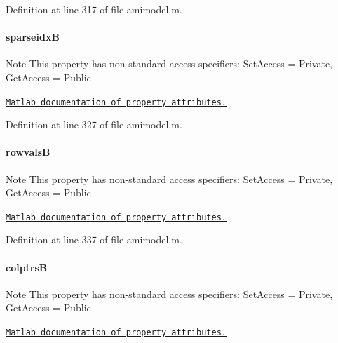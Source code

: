 Definition at line 317 of file amimodel.\+m.

\hypertarget{classamimodel_adcfae93a688a66f1954d0832f51e4cc0}{}
\paragraph[{sparseidx\+B}]{\setlength{\rightskip}{0pt plus 5cm}sparseidx\+B}\label{classamimodel_adcfae93a688a66f1954d0832f51e4cc0}
\begin{DoxyNote}{Note}
This property has non-\/standard access specifiers\+: {\ttfamily Set\+Access = Private, Get\+Access = Public} 

\href{http://www.mathworks.com/help/matlab/matlab_oop/property-attributes.html}{\tt Matlab documentation of property attributes.} 
\end{DoxyNote}


Definition at line 327 of file amimodel.\+m.

\hypertarget{classamimodel_a1ba81ee0e28fe7c7576911973c82be70}{}
\paragraph[{rowvals\+B}]{\setlength{\rightskip}{0pt plus 5cm}rowvals\+B}\label{classamimodel_a1ba81ee0e28fe7c7576911973c82be70}
\begin{DoxyNote}{Note}
This property has non-\/standard access specifiers\+: {\ttfamily Set\+Access = Private, Get\+Access = Public} 

\href{http://www.mathworks.com/help/matlab/matlab_oop/property-attributes.html}{\tt Matlab documentation of property attributes.} 
\end{DoxyNote}


Definition at line 337 of file amimodel.\+m.

\hypertarget{classamimodel_a3a4891c5565b544dd7d4362dbbfaadf7}{}
\paragraph[{colptrs\+B}]{\setlength{\rightskip}{0pt plus 5cm}colptrs\+B}\label{classamimodel_a3a4891c5565b544dd7d4362dbbfaadf7}
\begin{DoxyNote}{Note}
This property has non-\/standard access specifiers\+: {\ttfamily Set\+Access = Private, Get\+Access = Public} 

\href{http://www.mathworks.com/help/matlab/matlab_oop/property-attributes.html}{\tt Matlab documentation of property attributes.} 
\end{DoxyNote}


